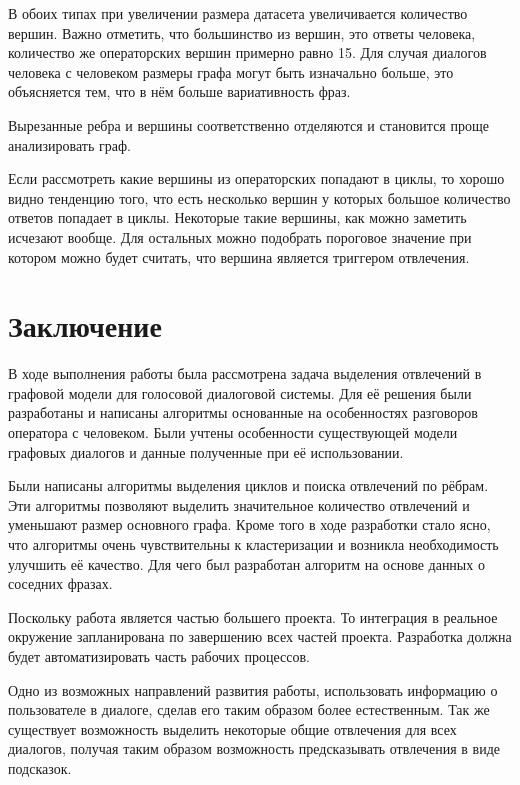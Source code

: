 \documentclass[specification,annotation]{itmo-student-thesis}
\begin{document}
	В обоих типах при увеличении размера датасета увеличивается количество вершин. Важно отметить, что большинство из вершин, это ответы человека, количество же операторских вершин примерно равно 15. Для случая диалогов человека с человеком размеры графа могут быть изначально больше, это объясняется тем, что в нём больше вариативность фраз.
	
	Вырезанные ребра и вершины соответственно отделяются и становится проще анализировать граф.
	
	Если рассмотреть какие вершины из операторских попадают в циклы, то хорошо видно тенденцию того, что есть несколько вершин у которых большое количество ответов попадает в циклы. Некоторые такие вершины, как можно заметить исчезают вообще. Для остальных можно подобрать пороговое значение при котором можно будет считать, что вершина является триггером отвлечения.
	
	\chapter*{Заключение}
	В ходе выполнения работы была рассмотрена задача выделения отвлечений в графовой модели для голосовой диалоговой системы. Для её решения были разработаны и написаны алгоритмы основанные на особенностях разговоров оператора с человеком. Были учтены особенности существующей модели графовых диалогов и данные полученные при её использовании.
	
	Были написаны алгоритмы выделения циклов и поиска отвлечений по рёбрам. Эти алгоритмы позволяют выделить значительное количество отвлечений и уменьшают размер основного графа. Кроме того в ходе разработки стало ясно, что алгоритмы очень чувствительны к кластеризации и возникла необходимость улучшить её качество. Для чего был разработан алгоритм на основе данных о соседних фразах.
	
	Поскольку работа является частью большего проекта. То интеграция в реальное окружение запланирована по завершению всех частей проекта. Разработка должна будет автоматизировать часть рабочих процессов.
	
	Одно из возможных направлений развития работы, использовать информацию о пользователе в диалоге, сделав его таким образом более естественным. Так же существует возможность выделить некоторые общие отвлечения для всех диалогов, получая таким образом возможность предсказывать отвлечения в виде подсказок.
	
	
\end{document}
